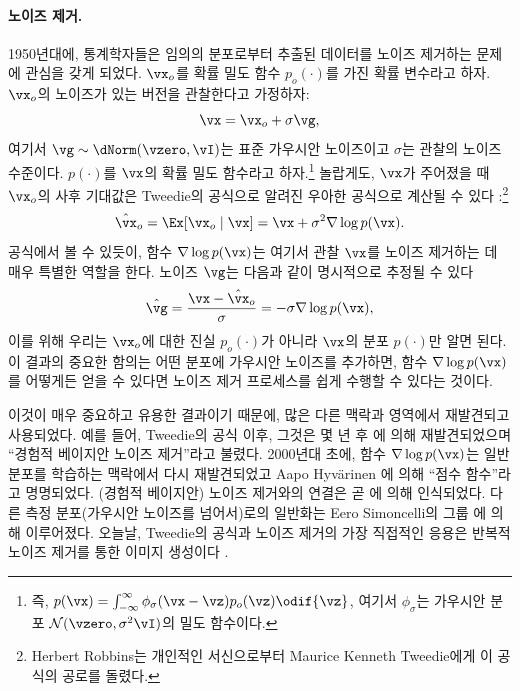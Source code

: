 \documentclass[../../book-main_ko.tex]{subfiles}
\begin{document}
\paragraph{노이즈 제거.} 1950년대에, 통계학자들은 임의의 분포로부터 추출된 데이터를 노이즈 제거하는 문제에 관심을 갖게 되었다. \(\vx_{o}\)를 확률 밀도 함수 \(p_{o}(\cdot)\)를 가진 확률 변수라고 하자. \(\vx_{o}\)의 노이즈가 있는 버전을 관찰한다고 가정하자:
\begin{equation}
    \vx = \vx_{o} + \sigma \vg,
\end{equation}
여기서 \(\vg \sim \dNorm(\vzero, \vI)\)는 표준 가우시안 노이즈이고 \(\sigma\)는 관찰의 노이즈 수준이다. \(p(\cdot)\)를 \(\vx\)의 확률 밀도 함수라고 하자.\footnote{즉, \(p(\vx) = \int_{-\infty}^{\infty} \phi_{\sigma}(\vx - \vz)p_{o}(\vz) \odif{\vz}\), 여기서 \(\phi_{\sigma}\)는 가우시안 분포 \(\mathcal{N}(\vzero, \sigma^{2} \vI)\)의 밀도 함수이다.} 놀랍게도, \(\vx\)가 주어졌을 때 \(\vx_{o}\)의 사후 기대값은 Tweedie의 공식으로 알려진 우아한 공식으로 계산될 수 있다 \cite{Robbins1956AnEB}:\footnote{Herbert Robbins는 개인적인 서신으로부터 Maurice Kenneth Tweedie에게 이 공식의 공로를 돌렸다.}
\begin{equation}
    \hat{\vx}_{o} = \Ex[\vx_{o}\mid \vx] = \vx + \sigma^{2} \nabla \log p(\vx).
\end{equation}
공식에서 볼 수 있듯이, 함수 \(\nabla \log p(\vx)\)는 여기서 관찰 \(\vx\)를 노이즈 제거하는 데 매우 특별한 역할을 한다. 노이즈 \(\vg\)는 다음과 같이 명시적으로 추정될 수 있다
\begin{equation}
    \hat{\vg} = \frac{\vx - \hat{\vx}_{o}}{\sigma} = -\sigma \nabla \log p(\vx),
\end{equation}
이를 위해 우리는 \(\vx_{o}\)에 대한 진실 \(p_{o}(\cdot)\)가 아니라 \(\vx\)의 분포 \(p(\cdot)\)만 알면 된다. 이 결과의 중요한 함의는 어떤 분포에 가우시안 노이즈를 추가하면, 함수 \(\nabla \log p(\vx)\)를 어떻게든 얻을 수 있다면 노이즈 제거 프로세스를 쉽게 수행할 수 있다는 것이다.

이것이 매우 중요하고 유용한 결과이기 때문에, 많은 다른 맥락과 영역에서 재발견되고 사용되었다. 예를 들어, Tweedie의 공식 \cite{Robbins1956AnEB} 이후, 그것은 몇 년 후 \cite{Miyasawa61}에 의해 재발견되었으며 ``경험적 베이지안 노이즈 제거''라고 불렸다. 2000년대 초에, 함수 \(\nabla \log p(\vx)\)는 일반 분포를 학습하는 맥락에서 다시 재발견되었고 Aapo Hyv\"{a}rinen \cite{hyvarinen05a}에 의해 ``점수 함수''라고 명명되었다. (경험적 베이지안) 노이즈 제거와의 연결은 곧 \cite{Vincent2011}에 의해 인식되었다.
다른 측정 분포(가우시안 노이즈를 넘어서)로의 일반화는 Eero Simoncelli의 그룹 \cite{Raphan10}에 의해 이루어졌다. 오늘날, Tweedie의 공식과 노이즈 제거의 가장 직접적인 응용은 반복적 노이즈 제거를 통한 이미지 생성이다 \cite{Kadkhodaie21a,ho2020denoising}.
\end{document}
